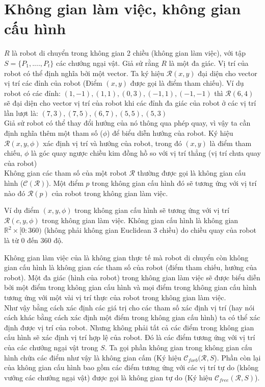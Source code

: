 \documentclass[a4paper,12pt]{report}
\begin{document}
\section{Không gian làm việc, không gian cấu hình}
$R$ là robot di chuyển trong không gian 2 chiều (không gian làm việc), với tập $S = \{P_1, ...., P_t\}$ các chướng ngại vật. Giả sử rằng $R$ là một đa giác. Vị trí của robot có thể định nghĩa bởi một vector. Ta ký hiệu $\mathcal{R}(x,y)$ đại diện cho vector vị trí các đỉnh của robot (Điểm $(x,y)$ được gọi là điểm tham chiếu). Ví dụ robot có các đỉnh: $(1,-1), (1,1), (0,3), (-1,1), (-1,-1)$ thì $\mathcal{R}(6,4)$ sẽ đại diện cho vector vị trí của robot khi các đỉnh đa giác của robot ở các vị trí lần lượt là: $(7,3), (7,5), (6,7), (5,5), (5,3)$\\[0.6em]
Giả sử robot có thể thay đổi hướng của nó thông qua phép quay, vì vậy ta cần định nghĩa thêm một tham số ($\phi$) để biểu diễn hướng của robot. Ký hiệu $\mathcal{R}(x,y,\phi)$ xác định vị trí và hướng của robot, trong đó $(x,y)$ là điểm tham chiếu, $\phi$ là góc quay ngược chiều kim đồng hồ so với vị trí thẳng (vị trí chưa quay của robot)\\[0.6em]
Không gian các tham số của một robot $\mathcal{R}$ thường được gọi là không gian cấu hình ($\mathcal{C}(\mathcal{R})$). Một điểm $p$ trong không gian cấu hình đó sẽ tương ứng với vị trí nào đó $\mathcal{R}(p)$ của robot trong không gian làm việc.
\par Ví dụ điểm $(x,y,\phi)$ trong không gian cấu hình sẽ tương ứng với vị trí $\mathcal{R}(c,y,\phi)$ trong không gian làm việc. Không gian cấu hình là không gian $\mathbb{R}^2\times[0:360)$ (không phải không gian Euclidean 3 chiều) do chiều quay của robot là từ 0 đến 360 độ.
\par Không gian làm việc của là không gian thực tế mà robot di chuyển còn không gian cấu hình là không gian các tham số của robot (điểm tham chiếu, hướng của robot). Một đa giác (hình của robot) trong không gian làm việc sẽ được biểu diễn bởi một điểm trong không gian cấu hình và mọi điểm trong không gian cấu hình tương ứng với một vài vị trí thực của robot trong không gian làm việc.\\[0.6em]
Như vậy bằng cách xác định các giá trị cho các tham số xác định vị trí (hay nói cách khác bằng cách xác định một điểm trong không gian cấu hình) ta có thể xác định được vị trí của robot. Nhưng không phải tất cả các điểm trong không gian cấu hình sẽ xác định vị trí hợp lệ của robot. Đó là các điểm tương ứng với vị trí của các chướng ngại vật trong $S$. Ta gọi phần không gian trong không gian cấu hình chứa các điểm như vậy là không gian cấm (Ký hiệu $\mathcal{C}_{forb}(\mathcal{R},S$). Phần còn lại của không gian cấu hình bao gồm các điểm tương ứng với các vị trí tự do (không vướng các chướng ngại vật) được gọi là không gian tự do (Ký hiệu $\mathcal{C}_{free}(\mathcal{R},S)$).
\end{document}
